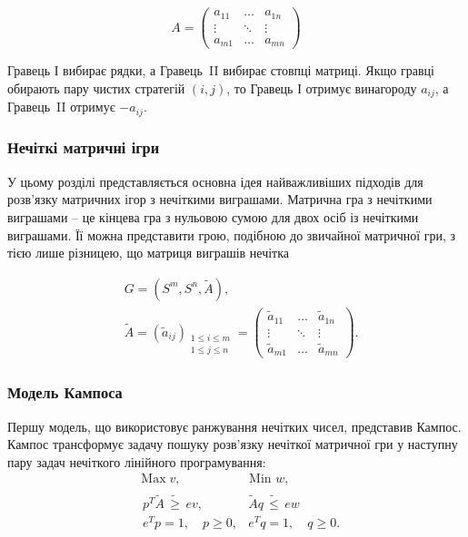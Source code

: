 \documentclass[14pt, a4paper, oneside]{extarticle}
\numberwithin{equation}{section}
\newcommand{\geqslant}{\geq}
\newcommand{\leqslant}{\leq}
\begin{document}
\begin{equation}
A=\left(\begin{array}{lll}
a_{11} & \ldots & a_{1 n} \\
\vdots & \ddots & \vdots \\
a_{m 1} & \ldots & a_{m n}
\end{array}\right)
\end{equation}

Гравець І вибирає рядки, а Гравець~II вибирає стовпці матриці. Якщо гравці обирають пару чистих стратегій $(i, j)$, то Гравець І отримує винагороду $a_{i j}$, а Гравець~II отримує $-a_{i j}$.

\subsubsection{Нечіткі матричні ігри}
У цьому розділі представляється основна ідея найважливіших підходів для розв'язку матричних ігор з нечіткими виграшами. Матрична гра з нечіткими виграшами -- це кінцева гра з нульовою сумою для двох осіб із нечіткими виграшами. Її можна представити грою, подібною до звичайної матричної гри, з тією лише різницею, що матриця виграшів нечітка

\begin{equation}
\begin{aligned}
& G=\left(S^{m}, S^{n}, \tilde{A}\right), \\
& \tilde{A}=\left(\tilde{a}_{i j}\right)_{\substack{1 \leqslant i \leqslant m \\
1 \leqslant j \leqslant n}}=\left(\begin{array}{llll}
\tilde{a}_{11} & \ldots & \tilde{a}_{1 n} \\
\vdots & \ddots & \vdots \\
\tilde{a}_{m 1} & \ldots & \tilde{a}_{m n}
\end{array}\right).
\end{aligned}
\end{equation}

\subsubsection{Модель Кампоса}
Першу модель, що використовує ранжування нечітких чисел, представив Кампос. Кампос трансформує задачу пошуку розв'язку нечіткої матричної гри у наступну пару задач нечіткого лінійного програмування:
\begin{equation}
\begin{aligned}
& \operatorname{Max} v, \qquad \qquad \quad \text { Min } w , \\
& \begin{array}{ll}p^{T} \tilde{A} \, \tilde{\geqslant} \, e v , & \tilde{A} q \,\tilde{\leqslant}\, e w \\e^{T} p=1, \quad  p \geqslant 0 , & e^{T} q=1, \quad q \geqslant 0 .\end{array}
\end{aligned}
\end{equation}
\end{document}
